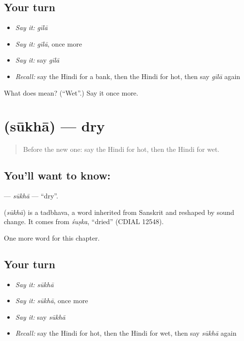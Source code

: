 \subsection*{Your turn}
\begin{itemize}
\raggedright
  \item \emph{Say it:} \emph{gīlā}
  \item \emph{Say it:} \emph{gīlā}, once more
  \item \emph{Say it:} say \emph{gīlā}
  \item \emph{Recall:} say the Hindi for a bank, then the Hindi for hot, then say \emph{gīlā} again
\end{itemize}

\begin{tcolorbox}[breakable,colback=teal!4,colframe=teal!35!black,title={Before you move on}]
What does  mean? (\textquotedblleft{}Wet\textquotedblright{}.) Say it once more.
\end{tcolorbox}
\section[\texorpdfstring{\hi{सूखा} (sūkhā)}{सूखा (sūkhā)}]{ (sūkhā) — dry}

\label{lesson:HI-C154-sukha}



\begin{quote}
Before the new one: say the Hindi for hot, then the Hindi for wet.
\end{quote}

\subsection*{You'll want to know: }
\textbf{} — \emph{sūkhā} — \textquotedblleft{}dry\textquotedblright{}.

\begin{cousinweb}
\textbf{} (\emph{sūkhā}) is a tadbhava, a word inherited from Sanskrit and reshaped by sound change. It comes from \emph{śuṣka}, \textquotedblleft{}dried\textquotedblright{} (CDIAL 12548).
\end{cousinweb}

\begin{grammarlens}[title={What you've built}]
One more word for this chapter.
\end{grammarlens}

\subsection*{Your turn}
\begin{itemize}
\raggedright
  \item \emph{Say it:} \emph{sūkhā}
  \item \emph{Say it:} \emph{sūkhā}, once more
  \item \emph{Say it:} say \emph{sūkhā}
  \item \emph{Recall:} say the Hindi for hot, then the Hindi for wet, then say \emph{sūkhā} again
\end{itemize}

